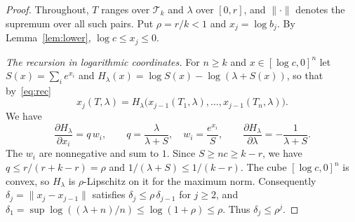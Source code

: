\documentclass[11pt]{amsart}
\theoremstyle{definition}
\newcommand{\cT}{\mathcal{T}}
\begin{document}
\begin{proof}
Throughout, $T$ ranges over $\cT_k$ and $\lambda$ over $[0,r]$, and $\|\cdot\|$ denotes the supremum over all
such pairs. Put $\rho=r/k<1$ and $x_j=\log b_j$. By Lemma~\ref{lem:lower}, $\log c\le x_j\le0$.

\emph{The recursion in logarithmic coordinates.} For $n\ge k$ and $x\in[\log c,0]^n$ let
$S(x)=\sum_ie^{x_i}$ and $H_\lambda(x)=\log S(x)-\log(\lambda+S(x))$, so that by~\eqref{eq:rec}
\[
   x_j(T,\lambda)=H_\lambda\bigl(x_{j-1}(T_1,\lambda),\dots,x_{j-1}(T_n,\lambda)\bigr).
\]
We have
\begin{equation}\label{eq:partials}
   \frac{\partial H_\lambda}{\partial x_i}=q\,w_i,\qquad q=\frac{\lambda}{\lambda+S},\quad w_i=\frac{e^{x_i}}{S},
   \qquad \frac{\partial H_\lambda}{\partial\lambda}=-\frac1{\lambda+S}.
\end{equation}
The $w_i$ are nonnegative and sum to $1$. Since $S\ge nc\ge k-r$, we have $q\le r/(r+k-r)=\rho$ and
$1/(\lambda+S)\le1/(k-r)$. The cube $[\log c,0]^n$ is convex, so $H_\lambda$ is $\rho$-Lipschitz on it for the
maximum norm. Consequently $\delta_j=\|x_j-x_{j-1}\|$ satisfies $\delta_j\le\rho\,\delta_{j-1}$ for $j\ge2$,
and $\delta_1=\sup\log((\lambda+n)/n)\le\log(1+\rho)\le\rho$. Thus $\delta_j\le\rho^j$.


\end{proof}
\end{document}

